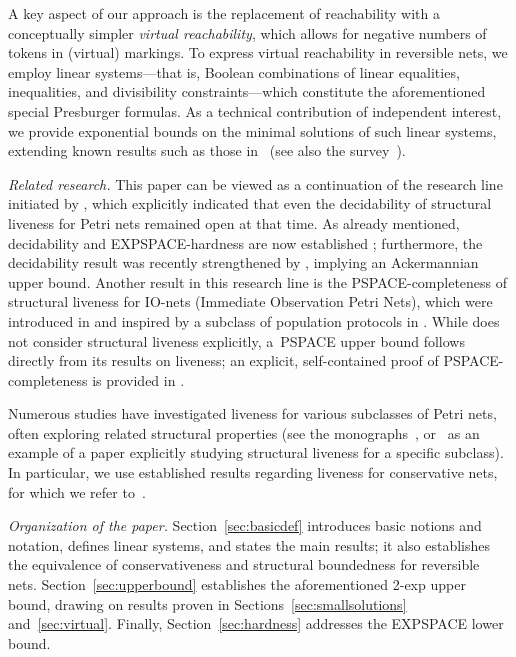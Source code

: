\documentclass[11pt,a4paper]{amsart}
\theoremstyle{plain}
\theoremstyle{definition}
\theoremstyle{defC}
\theoremstyle{thmC}
\begin{document}
A key aspect of our approach is the replacement of
reachability with a conceptually simpler \emph{virtual reachability},
which allows for negative numbers of tokens in (virtual) markings. To
express virtual reachability in reversible nets, we employ linear
systems---that  is, Boolean combinations of linear equalities,
inequalities, and
divisibility constraints---which constitute the aforementioned
special
Presburger formulas. As a technical contribution of independent
interest, we provide exponential bounds on the minimal solutions of
such linear systems, extending known results such as those
in~\cite{DBLP:conf/rta/Pottier91} (see also the survey~\cite{DBLP:journals/siglog/Haase18}).




\emph{Related research.}
This paper can be viewed as a continuation of the research line
initiated by \cite{DBLP:journals/ipl/BestE16}, which explicitly
indicated that even the decidability of structural liveness for Petri
nets remained open at that time. As already mentioned, decidability
and EXPSPACE-hardness are now established
\cite{DBLP:journals/acta/JancarP19}; furthermore, the decidability
result was recently strengthened by \cite{DBLP:conf/concur/JancarL23,
DBLP:journals/lmcs/JancarL24}, implying an Ackermannian upper bound.
Another result in this research line is the PSPACE-completeness of
structural liveness for IO-nets (Immediate Observation Petri Nets),
which were introduced in \cite{DBLP:conf/apn/EsparzaRW19} and inspired
by a subclass of population protocols in
\cite{DBLP:journals/dc/AngluinAER07}. While
\cite{DBLP:conf/apn/EsparzaRW19} does not consider structural liveness
explicitly, a~PSPACE upper bound follows directly from its results on liveness; an explicit, self-contained proof of PSPACE-completeness is provided in \cite{DBLP:journals/fuin/JancarV22}.


Numerous studies have investigated liveness for various subclasses of
Petri nets, often exploring related structural properties (see
the monographs~\cite{reisig2013, BestDevillers2024,
desel_esparza_1995}, or~\cite{DBLP:journals/fuin/HujsaD18} as 
an example of a paper explicitly studying structural liveness 
for a specific subclass). In particular, we use established results
regarding liveness for conservative nets, for which we refer to~\cite{DBLP:conf/apn/MayrW14}.




\emph{Organization of the paper.} 
Section~\ref{sec:basicdef} introduces basic notions and notation,
defines linear systems, 
and states the main results; it also establishes the equivalence of conservativeness and structural boundedness for reversible nets. Section~\ref{sec:upperbound} establishes the aforementioned 2-exp upper bound, drawing on results proven in Sections~\ref{sec:smallsolutions} and~\ref{sec:virtual}. Finally, Section~\ref{sec:hardness} addresses the EXPSPACE lower bound.
\end{document}

